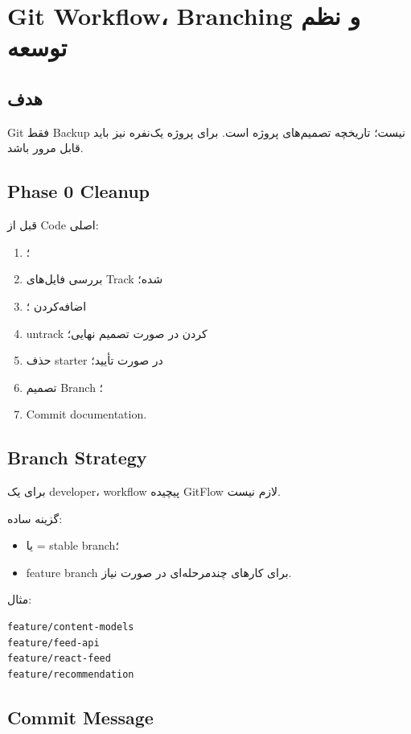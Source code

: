 
\chapter{Git Workflow، Branching و نظم توسعه}

\section{هدف}

Git فقط Backup نیست؛ تاریخچه تصمیم‌های پروژه است. برای پروژه یک‌نفره نیز باید قابل مرور باشد.

\section{Phase 0 Cleanup}

قبل از Code اصلی:
\begin{enumerate}
  \item {}؛
  \item بررسی فایل‌های Track شده؛
  \item اضافه‌کردن ؛
  \item untrack کردن  در صورت تصمیم نهایی؛
  \item حذف  starter در صورت تأیید؛
  \item تصمیم Branch ؛
  \item Commit documentation.
\end{enumerate}

\section{Branch Strategy}

برای یک developer، workflow پیچیده GitFlow لازم نیست.

گزینه ساده:
\begin{itemize}
  \item {} یا  = stable branch؛
  \item feature branch برای کارهای چندمرحله‌ای در صورت نیاز.
\end{itemize}

مثال:
\begin{latin}
\begin{lstlisting}
feature/content-models
feature/feed-api
feature/react-feed
feature/recommendation
\end{lstlisting}
\end{latin}

\section{Commit Message}

